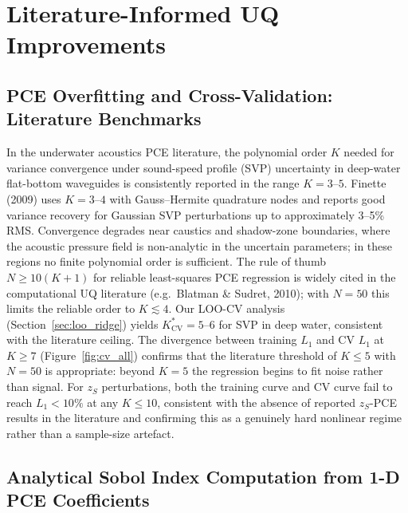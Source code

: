 \documentclass[11pt,a4paper]{article}
\begin{document}
\section{Literature-Informed UQ Improvements}
\label{sec:lit_improvements}

\subsection{PCE Overfitting and Cross-Validation: Literature Benchmarks}
\label{sec:cv_lit}

In the underwater acoustics PCE literature, the polynomial order $K$ needed for
variance convergence under sound-speed profile (SVP) uncertainty in deep-water
flat-bottom waveguides is consistently reported in the range $K = 3$--$5$.
Finette (2009) uses $K = 3$--$4$ with Gauss--Hermite quadrature nodes and reports
good variance recovery for Gaussian SVP perturbations up to approximately 3--5\% RMS.
Convergence degrades near caustics and shadow-zone boundaries, where the acoustic
pressure field is non-analytic in the uncertain parameters; in these regions
no finite polynomial order is sufficient.
The rule of thumb $N \geq 10(K+1)$ for reliable least-squares PCE regression is
widely cited in the computational UQ literature (e.g.\ Blatman \& Sudret, 2010);
with $N = 50$ this limits the reliable order to $K \lesssim 4$.
Our LOO-CV analysis (Section~\ref{sec:loo_ridge}) yields $K^*_\text{CV} = 5$--$6$
for SVP in deep water, consistent with the literature ceiling.
The divergence between training $L_1$ and CV $L_1$ at $K \geq 7$ (Figure~\ref{fig:cv_all})
confirms that the literature threshold of $K \leq 5$ with $N = 50$ is appropriate:
beyond $K = 5$ the regression begins to fit noise rather than signal.
For $z_S$ perturbations, both the training curve and CV curve fail to reach
$L_1 < 10\%$ at any $K \leq 10$, consistent with the absence of reported $z_S$-PCE
results in the literature and confirming this as a genuinely hard nonlinear regime
rather than a sample-size artefact.

\subsection{Analytical Sobol Index Computation from 1-D PCE Coefficients}
\label{sec:sobol_formula}
\end{document}
